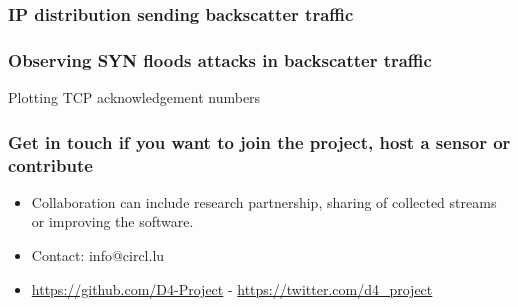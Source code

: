 \documentclass{beamer}
\begin{document}
\begin{frame}
    \frametitle{IP distribution sending backscatter traffic}
    \begin{center}
        \scalebox{0.9}{}
    \end{center}
\end{frame}
\begin{frame}
    \frametitle{Observing SYN floods attacks in backscatter traffic}
    Plotting TCP acknowledgement numbers
    \begin{center}
        \scalebox{0.7}{}
    \end{center}
\end{frame}

\begin{frame}
\frametitle{Get in touch if you want to join the project, host a sensor or contribute}
\begin{itemize}
\item Collaboration can include research partnership, sharing of collected streams or improving the software.
\item Contact: info@circl.lu
\item \url{https://github.com/D4-Project} -  \url{https://twitter.com/d4_project}
\end{itemize}
\end{frame}
\end{document}
